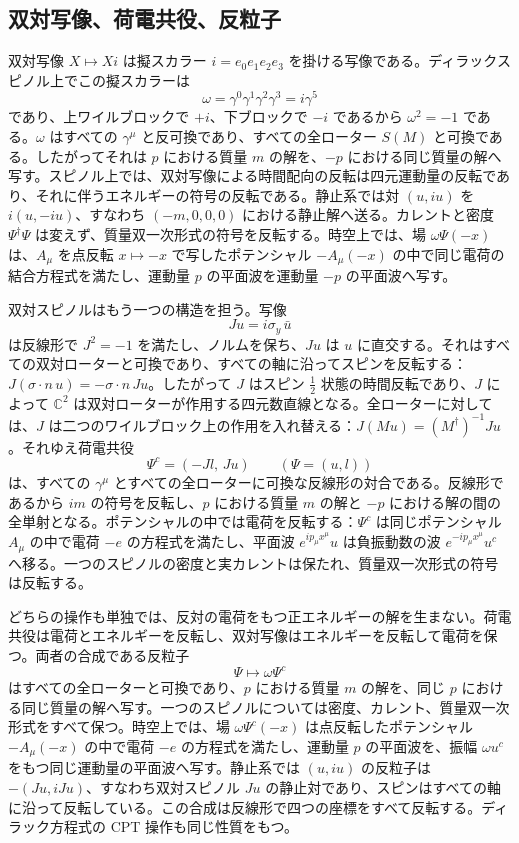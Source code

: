 \documentclass[a4paper]{article}
\begin{document}
\subsection{双対写像、荷電共役、反粒子}
\label{subsec:antiparticle}

双対写像 $X\mapsto Xi$ は擬スカラー $i=e_0e_1e_2e_3$ を掛ける写像である。ディラックスピノル上でこの擬スカラーは
\[
\omega=\gamma^0\gamma^1\gamma^2\gamma^3=i\gamma^5
\]
であり、上ワイルブロックで $+i$、下ブロックで $-i$ であるから $\omega^2=-1$ である。$\omega$ はすべての $\gamma^\mu$ と反可換であり、すべての全ローター $S(M)$ と可換である。したがってそれは $p$ における質量 $m$ の解を、$-p$ における同じ質量の解へ写す。スピノル上では、双対写像による時間配向の反転は四元運動量の反転であり、それに伴うエネルギーの符号の反転である。静止系では対 $(u,iu)$ を $i(u,-iu)$、すなわち $(-m,0,0,0)$ における静止解へ送る。カレントと密度 $\Psi^\dagger\Psi$ は変えず、質量双一次形式の符号を反転する。時空上では、場 $\omega\Psi(-x)$ は、$A_\mu$ を点反転 $x\mapsto -x$ で写したポテンシャル $-A_\mu(-x)$ の中で同じ電荷の結合方程式を満たし、運動量 $p$ の平面波を運動量 $-p$ の平面波へ写す。

双対スピノルはもう一つの構造を担う。写像
\[
Ju=i\sigma_y\,\bar u
\]
は反線形で $J^2=-1$ を満たし、ノルムを保ち、$Ju$ は $u$ に直交する。それはすべての双対ローターと可換であり、すべての軸に沿ってスピンを反転する：$J(\sigma\cdot n\,u)=-\sigma\cdot n\,Ju$。したがって $J$ はスピン $\tfrac12$ 状態の時間反転であり、$J$ によって $\mathbb{C}^2$ は双対ローターが作用する四元数直線となる。全ローターに対しては、$J$ は二つのワイルブロック上の作用を入れ替える：$J(Mu)=(M^\dagger)^{-1}Ju$。それゆえ荷電共役
\[
\Psi^c=(-Jl,\,Ju)\qquad(\Psi=(u,l))
\]
は、すべての $\gamma^\mu$ とすべての全ローターに可換な反線形の対合である。反線形であるから $im$ の符号を反転し、$p$ における質量 $m$ の解と $-p$ における解の間の全単射となる。ポテンシャルの中では電荷を反転する：$\Psi^c$ は同じポテンシャル $A_\mu$ の中で電荷 $-e$ の方程式を満たし、平面波 $e^{ip_\mu x^\mu}u$ は負振動数の波 $e^{-ip_\mu x^\mu}u^c$ へ移る。一つのスピノルの密度と実カレントは保たれ、質量双一次形式の符号は反転する。

どちらの操作も単独では、反対の電荷をもつ正エネルギーの解を生まない。荷電共役は電荷とエネルギーを反転し、双対写像はエネルギーを反転して電荷を保つ。両者の合成である反粒子
\[
\Psi\mapsto\omega\Psi^c
\]
はすべての全ローターと可換であり、$p$ における質量 $m$ の解を、同じ $p$ における同じ質量の解へ写す。一つのスピノルについては密度、カレント、質量双一次形式をすべて保つ。時空上では、場 $\omega\Psi^c(-x)$ は点反転したポテンシャル $-A_\mu(-x)$ の中で電荷 $-e$ の方程式を満たし、運動量 $p$ の平面波を、振幅 $\omega u^c$ をもつ同じ運動量の平面波へ写す。静止系では $(u,iu)$ の反粒子は $-(Ju,iJu)$、すなわち双対スピノル $Ju$ の静止対であり、スピンはすべての軸に沿って反転している。この合成は反線形で四つの座標をすべて反転する。ディラック方程式の CPT 操作も同じ性質をもつ。
\end{document}
